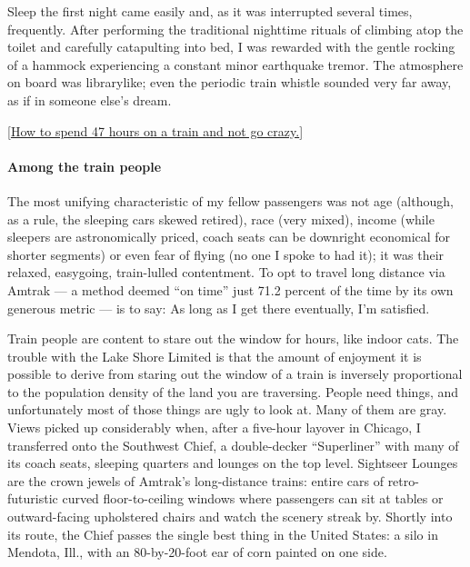 Sleep the first night came easily and, as it was interrupted several
times, frequently. After performing the traditional nighttime rituals of
climbing atop the toilet and carefully catapulting into bed, I was
rewarded with the gentle rocking of a hammock experiencing a constant
minor earthquake tremor. The atmosphere on board was librarylike; even
the periodic train whistle sounded very far away, as if in someone
else's dream.

\href{https://www.nytimes3xbfgragh.onion/2013/03/03/magazine/47-hour-train-ride.html}{{[}How
to spend 47 hours on a train and not go crazy.{]}}

\hypertarget{among-the-train-people}{%
\paragraph{\texorpdfstring{\textbf{Among the train
people}}{Among the train people}}\label{among-the-train-people}}

The most unifying characteristic of my fellow passengers was not age
(although, as a rule, the sleeping cars skewed retired), race (very
mixed), income (while sleepers are astronomically priced, coach seats
can be downright economical for shorter segments) or even fear of flying
(no one I spoke to had it); it was their relaxed, easygoing,
train-lulled contentment. To opt to travel long distance via Amtrak ---
a method deemed ``on time'' just 71.2 percent of the time by its own
generous metric --- is to say: As long as I get there eventually, I'm
satisfied.

Train people are content to stare out the window for hours, like indoor
cats. The trouble with the Lake Shore Limited is that the amount of
enjoyment it is possible to derive from staring out the window of a
train is inversely proportional to the population density of the land
you are traversing. People need things, and unfortunately most of those
things are ugly to look at. Many of them are gray. Views picked up
considerably when, after a five-hour layover in Chicago, I transferred
onto the Southwest Chief, a double-decker ``Superliner'' with many of
its coach seats, sleeping quarters and lounges on the top level.
Sightseer Lounges are the crown jewels of Amtrak's long-distance trains:
entire cars of retro-futuristic curved floor-to-ceiling windows where
passengers can sit at tables or outward-facing upholstered chairs and
watch the scenery streak by. Shortly into its route, the Chief passes
the single best thing in the United States: a silo in Mendota, Ill.,
with an 80-by-20-foot ear of corn painted on one side.

